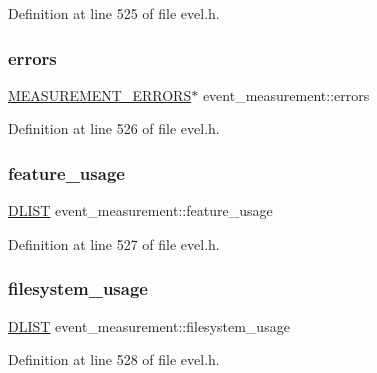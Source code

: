 Definition at line 525 of file evel.\+h.

\hypertarget{structevent__measurement_abfc769938b8ba8047613b0f8ba704597}{}\label{structevent__measurement_abfc769938b8ba8047613b0f8ba704597} 
\subsubsection{\texorpdfstring{errors}{errors}}
{\footnotesize\ttfamily \hyperlink{evel_8h_aea88424203894a4b4720600fe7131df7}{M\+E\+A\+S\+U\+R\+E\+M\+E\+N\+T\+\_\+\+E\+R\+R\+O\+RS}$\ast$ event\+\_\+measurement\+::errors}



Definition at line 526 of file evel.\+h.

\hypertarget{structevent__measurement_a3bdd3e143db79d5ffc5b24cb875d3088}{}\label{structevent__measurement_a3bdd3e143db79d5ffc5b24cb875d3088} 
\subsubsection{\texorpdfstring{feature\+\_\+usage}{feature\_usage}}
{\footnotesize\ttfamily \hyperlink{double__list_8h_a45f4a129042d9e1aa4ffd31fe13e4d14}{D\+L\+I\+ST} event\+\_\+measurement\+::feature\+\_\+usage}



Definition at line 527 of file evel.\+h.

\hypertarget{structevent__measurement_a7d01f500029deef0550691678f9a4de2}{}\label{structevent__measurement_a7d01f500029deef0550691678f9a4de2} 
\subsubsection{\texorpdfstring{filesystem\+\_\+usage}{filesystem\_usage}}
{\footnotesize\ttfamily \hyperlink{double__list_8h_a45f4a129042d9e1aa4ffd31fe13e4d14}{D\+L\+I\+ST} event\+\_\+measurement\+::filesystem\+\_\+usage}



Definition at line 528 of file evel.\+h.

